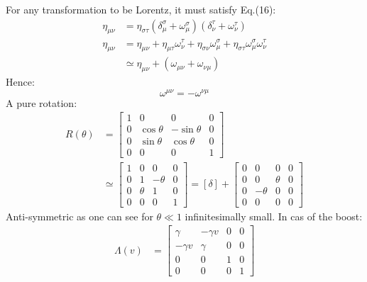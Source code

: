 \documentclass{article}
\begin{document}
For any transformation to be Lorentz, it must satisfy Eq.(16):
\begin{equation}
    \begin{split}
        \eta_{\mu\nu} & = \eta_{\sigma\tau}(\delta^\sigma_\mu + \omega^\sigma_\mu)(\delta^\tau_\nu + \omega^\tau_\nu)\\
        \eta_{\mu\nu} & = \eta_{\mu\nu} + \eta_{\mu\tau} \omega^\tau_\nu + \eta_{\sigma\nu}\omega^\sigma_\mu + \eta_{\sigma\tau}\omega^\sigma_\mu\omega^\tau_\nu \\
        & \simeq \eta_{\mu\nu} + (\omega_{\mu\nu} + \omega_{\nu\mu}) 
    \end{split}
\end{equation}
Hence:
\begin{equation}
    \omega^{\mu\nu} = - \omega^{\nu\mu}
\end{equation}
A pure rotation:
\begin{equation}
    \begin{split}
    R(\theta) & = \begin{bmatrix}
            1 & 0 & 0 & 0 \\
            0 & \cos{\theta} & -\sin{\theta} & 0 \\
            0 & \sin{\theta} & \cos{\theta} & 0 \\ 
            0 & 0 & 0 & 1
                \end{bmatrix} \\
    & \simeq \begin{bmatrix}
            1  & 0 & 0 & 0 \\
            0  & 1 & -\theta & 0\\
            0 & \theta & 1 & 0 \\
            0 & 0 & 0 & 1  
            \end{bmatrix} = [\delta] + \begin{bmatrix}
                0  & 0 & 0 & 0 \\
                0  & 0 & \theta & 0\\
                0 & -\theta & 0 & 0\\
                0 & 0 & 0 & 0
            \end{bmatrix}
    \end{split}
\end{equation}
Anti-symmetric as one can see for $\theta \ll 1$ infinitesimally small.
In cas of the boost:
\begin{equation}
    \begin{split}
        \Lambda(v) & = \begin{bmatrix}
                \gamma & -\gamma v & 0 & 0\\
                -\gamma v & \gamma & 0 & 0 \\
                0 & 0 & 1 & 0 \\
                0 & 0 & 0 & 1
                        \end{bmatrix}
    \end{split}
\end{equation}
\end{document}

